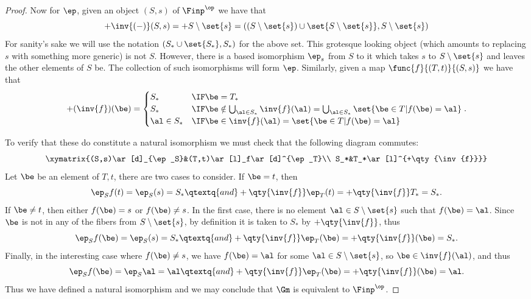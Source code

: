 \documentclass[main.tex]{subfiles}
\begin{document}
\begin{proof}
	Now for \(\ep\), given an object \((S,s)\) of \(\Finp^\op\) we have that
	\[+\inv{(-)}(S,s)=+S\setminus\set{s}=((S\setminus\set{s})
	\cup\set{S\setminus\set{s}},S\setminus\set{s})\]
	For sanity's sake we will use the notation \((S_*\cup\set{S_*},S_*)\) for
	the above set. This grotesque looking object (which amounts to replacing
	\(s\) with something more generic) is not \(S\). However, there is a based
	isomorphism \(\ep_s\) from \(S\) to it which takes \(s\) to
	\(S\setminus\set{s}\) and leaves the other elements of \(S\) be. The
	collection of such isomorphisms will form \(\ep\). Similarly, given a map
	\(\func{f}{(T,t)}{(S,s)}\) we have that
	\[+(\inv{f})(\be)=\begin{cases}
			S_* & \IF \be=T_* \\
			S_* & \IF \be\notin\bigcup_{\al\in S_*}\inv{f}(\al)=
			\bigcup_{\al\in S_*}\set{\be\in T|f(\be)=\al}\\
			\al\in S_* & \IF \be\in\inv{f}(\al)=\set{\be\in T|f(\be)=\al}
	\end{cases}.\]

	To verify that these do constitute a natural isomorphism we must check that
	the following diagram commutes:
	\[\xymatrix{(S,s)\ar[d]_{\ep_S}&(T,t)\ar[l]_f\ar[d]^{\ep_T}\\
	S_*&T_*\ar[l]^{+\qty{\inv{f}}}}\]
	Let \(\be\) be an element of \(T,t\), there are two cases to consider. If
	\(\be=t\), then
	\[\ep_Sf(t)=\ep_S(s)=S_*\qtextq{and}
	+\qty{\inv{f}}\ep_T(t)=+\qty{\inv{f}}T_*=S_*.\] If \(\be\neq t\), then
	either \(f(\be)=s\) or \(f(\be)\neq s\). In the first case, there is no element
	\(\al\in S\setminus\set{s}\) such that \(f(\be)=\al\). Since \(\be\) is not in
	any of the fibers from \(S\setminus\set{s}\), by definition it is taken to
	\(S_*\) by \(+\qty{\inv{f}}\), thus \[\ep_Sf(\be)=\ep_S(s)=S_*\qtextq{and}
	+\qty{\inv{f}}\ep_T(\be)=+\qty{\inv{f}}(\be)=S_*.\] Finally, in the
	interesting case where \(f(\be)\neq s\), we have \(f(\be)=\al\) for some
	\(\al\in S\setminus\set{s}\), so \(\be\in\inv{f}(\al)\), and thus
	\[\ep_Sf(\be)=\ep_S\al=\al\qtextq{and}
	+\qty{\inv{f}}\ep_T(\be)=+\qty{\inv{f}}(\be)=\al.\] Thus we have defined a
	natural isomorphism and we may conclude that \(\Gm\) is equivalent to
	\(\Finp^\op\).
\end{proof}
\end{document}
